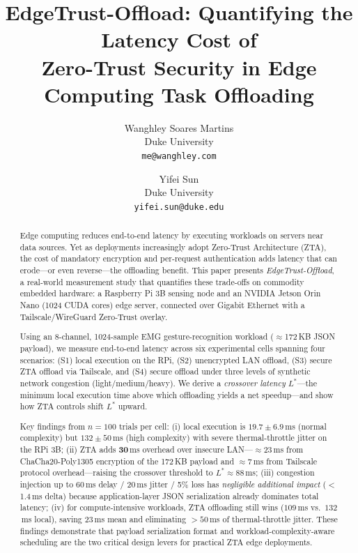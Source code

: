\documentclass[10pt,twocolumn]{article}
\title{\textbf{EdgeTrust-Offload: Quantifying the Latency Cost of\\
Zero-Trust Security in Edge Computing Task Offloading}\\[4pt]
}
\author{
Wanghley Soares Martins \\
Duke University \\
\texttt{me@wanghley.com}
\and
Yifei Sun \\
Duke University \\
\texttt{yifei.sun@duke.edu}
}
\date{}
\begin{document}
\maketitle

\begin{abstract}
Edge computing reduces end-to-end latency by executing workloads on servers
near data sources.  Yet as deployments increasingly adopt Zero-Trust
Architecture (ZTA), the cost of mandatory encryption and per-request
authentication adds latency that can erode—or even reverse—the offloading
benefit.  This paper presents \emph{EdgeTrust-Offload}, a real-world
measurement study that quantifies these trade-offs on commodity embedded
hardware: a Raspberry Pi 3B sensing node and an NVIDIA Jetson Orin Nano
(1024 CUDA cores) edge server, connected over Gigabit Ethernet with a
Tailscale/WireGuard Zero-Trust overlay.

Using an 8-channel, 1024-sample EMG gesture-recognition workload
($\approx$172\,KB JSON payload), we measure end-to-end latency across six
experimental cells spanning four scenarios: (S1) local execution on the RPi,
(S2) unencrypted LAN offload, (S3) secure ZTA offload via Tailscale, and (S4)
secure offload under three levels of synthetic network congestion
(light/medium/heavy).  We derive a \emph{crossover latency} $L^*$—the minimum
local execution time above which offloading yields a net speedup—and show how
ZTA controls shift $L^*$ upward.

Key findings from $n=100$ trials per cell: (i) local execution is
$19.7 \pm 6.9$\,ms (normal complexity) but $132 \pm 50$\,ms (high complexity)
with severe thermal-throttle jitter on the RPi 3B; (ii) ZTA adds
$\mathbf{30}$\,ms overhead over insecure LAN—$\approx$23\,ms from
ChaCha20-Poly1305 encryption of the 172\,KB payload and $\approx$7\,ms from
Tailscale protocol overhead—raising the crossover threshold to
$L^* \approx 88$\,ms; (iii) congestion injection up to 60\,ms delay /
20\,ms jitter / 5\% loss has \emph{negligible additional impact}
($<$1.4\,ms delta) because application-layer JSON serialization already
dominates total latency; (iv) for compute-intensive workloads, ZTA offloading
still wins ($109$\,ms vs.\ $132$\,ms local), saving 23\,ms mean and
eliminating $>50$\,ms of thermal-throttle jitter.  These findings demonstrate
that payload serialization format and workload-complexity-aware scheduling are
the two critical design levers for practical ZTA edge deployments.
\end{abstract}
\end{document}
